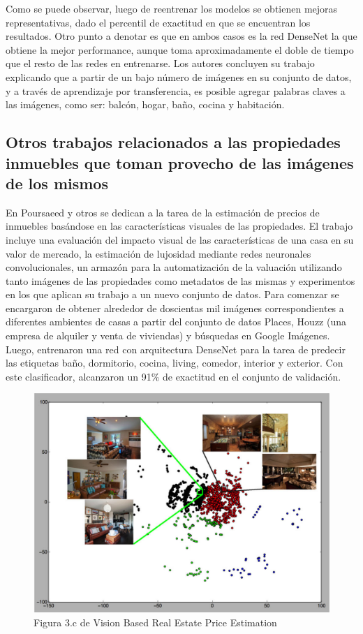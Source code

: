 Como se puede observar, luego de reentrenar los modelos se obtienen mejoras representativas, dado el percentil de exactitud en que se encuentran los resultados. Otro punto a denotar es que en ambos casos es la red DenseNet la que obtiene la mejor performance, aunque toma aproximadamente el doble de tiempo que el resto de las redes en entrenarse.
Los autores concluyen su trabajo explicando que a partir de un bajo número de imágenes en su conjunto de datos, y a través de aprendizaje por transferencia, es posible agregar palabras claves a las imágenes, como ser: balcón, hogar, baño, cocina y habitación.

\subsection{Otros trabajos relacionados a las propiedades inmuebles que toman provecho de las imágenes de los mismos}

En \cite{vision_based_real_estate_price_estimation} Poursaeed y otros se dedican a la tarea de la estimación de precios de inmuebles basándose en las características visuales de las propiedades. El trabajo incluye una evaluación del impacto visual de las características de una casa en su valor de mercado, la estimación de lujosidad mediante redes neuronales convolucionales, un armazón para la automatización de la valuación utilizando tanto imágenes de las propiedades como metadatos de las mismas y experimentos en los que aplican su trabajo a un nuevo conjunto de datos.
Para comenzar se encargaron de obtener alrededor de doscientas mil imágenes correspondientes a diferentes ambientes de casas a partir del conjunto de datos Places, Houzz (una empresa de alquiler y venta de viviendas) y búsquedas en Google Imágenes. Luego, entrenaron una red con arquitectura DenseNet para la tarea de predecir las etiquetas baño, dormitorio, cocina, living, comedor, interior y exterior. Con este clasificador, alcanzaron un 91\% de exactitud en el conjunto de validación.
\begin{figure}
	\centering
	\includegraphics[width=0.9\linewidth]{images/vision_based_example_3c}
	\caption[Figura 3.c de Vision Based Real Estate Price Estimation]{Figura 3.c de Vision Based Real Estate Price Estimation}
	\label{fig:visionbasedexample3c}
\end{figure}

